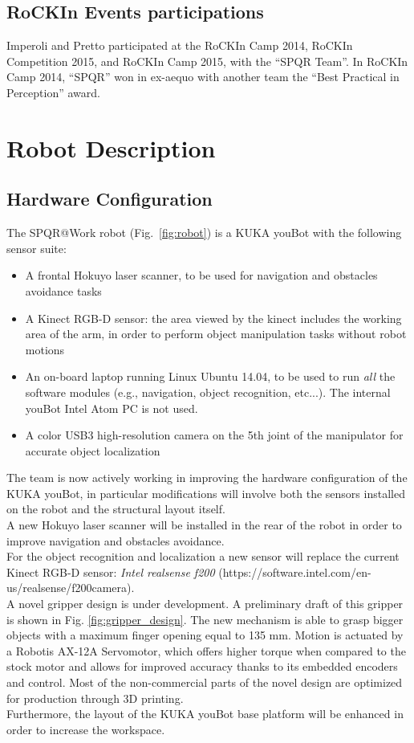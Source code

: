 \documentclass[conference]{IEEEtran}
\begin{document}
\subsection{RoCKIn Events participations}

Imperoli and Pretto participated at the RoCKIn Camp 2014, RoCKIn Competition 2015, and RoCKIn Camp 2015, with the ``SPQR Team''. In RoCKIn Camp 2014, ``SPQR'' won in ex-aequo with another team the ``Best Practical in Perception'' award.

\section{Robot Description}

\subsection{Hardware Configuration}

The SPQR@Work robot (Fig.~\ref{fig:robot}) is a KUKA youBot with the following sensor suite:

\begin{itemize}
 \item A frontal Hokuyo laser scanner, to be used for navigation and obstacles avoidance tasks
 \item A Kinect RGB-D sensor: the area viewed by the kinect includes the working area of the arm, in order to perform object manipulation tasks without robot motions
 \item An on-board laptop running Linux Ubuntu 14.04, to be used to run \textit{all} the software modules (e.g., navigation, object recognition, etc...). The internal youBot Intel Atom PC is not used.
 \item A color USB3 high-resolution camera on the 5th joint of the manipulator for accurate object localization
\end{itemize}

The team is now actively working in improving the hardware configuration of the KUKA youBot, in particular modifications will involve both the sensors installed on the robot and
the structural layout itself.\\
A new Hokuyo laser scanner will be installed in the rear of the robot in order to improve navigation and obstacles avoidance.\\
For the object recognition and localization a new sensor will replace the current Kinect RGB-D sensor: \emph{Intel realsense f200} (https://software.intel.com/en-us/realsense/f200camera).\\
A novel gripper design is under development. A preliminary draft of this gripper is shown in Fig. \ref{fig:gripper_design}. The new mechanism is able to grasp bigger objects with a maximum finger opening equal to 135 mm. Motion is actuated by a Robotis AX-12A Servomotor, which offers higher torque when compared to the stock motor and allows for improved accuracy thanks to its embedded encoders and control. Most of the non-commercial parts of the novel design are optimized for production through 3D printing.
\\Furthermore, the layout of the KUKA youBot base platform will be enhanced in order to increase the workspace.
\end{document}
